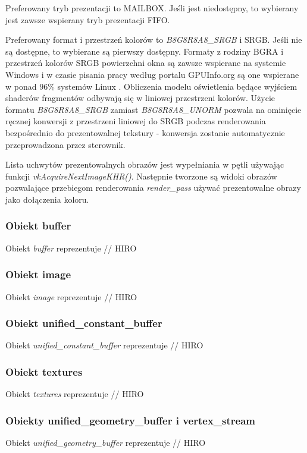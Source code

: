Preferowany tryb prezentacji to MAILBOX. Jeśli jest niedostępny, to wybierany jest zawsze wspierany tryb prezentacji FIFO.

Preferowany format i przestrzeń kolorów to \textit{B8G8R8A8\_SRGB} i SRGB. Jeśli nie są dostępne, to wybierane są pierwszy dostępny.
Formaty z rodziny BGRA i przestrzeń kolorów SRGB powierzchni okna są zawsze wspierane na systemie Windows i w czasie pisania pracy według portalu GPUInfo.org są one wspierane w ponad $96\%$ systemów Linux \cite{GPUINFO}.
Obliczenia modelu oświetlenia będące wyjściem shaderów fragmentów odbywają się w liniowej przestrzeni kolorów. Użycie formatu \textit{B8G8R8A8\_SRGB} zamiast \textit{B8G8R8A8\_UNORM} pozwala na ominięcie ręcznej konwersji z przestrzeni liniowej do SRGB podczas renderowania bezpośrednio do prezentowalnej tekstury - konwersja zostanie automatycznie przeprowadzona przez sterownik.

Lista uchwytów prezentowalnych obrazów jest wypełniania w pętli używając funkcji \textit{vkAcquireNextImageKHR()}.
Następnie tworzone są widoki obrazów pozwalające przebiegom renderowania \textit{render\_pass} używać prezentowalne obrazy jako dołączenia koloru.


\subsubsection{Obiekt buffer}
Obiekt \textit{buffer} reprezentuje 
// HIRO

\subsubsection{Obiekt image}
Obiekt \textit{image} reprezentuje 
// HIRO
 
\subsubsection{Obiekt unified\_constant\_buffer}
Obiekt \textit{unified\_constant\_buffer} reprezentuje 
// HIRO

\subsubsection{Obiekt textures}
Obiekt \textit{textures} reprezentuje 
// HIRO

\subsubsection{Obiekty unified\_geometry\_buffer i vertex\_stream}
Obiekt \textit{unified\_geometry\_buffer} reprezentuje 
// HIRO

